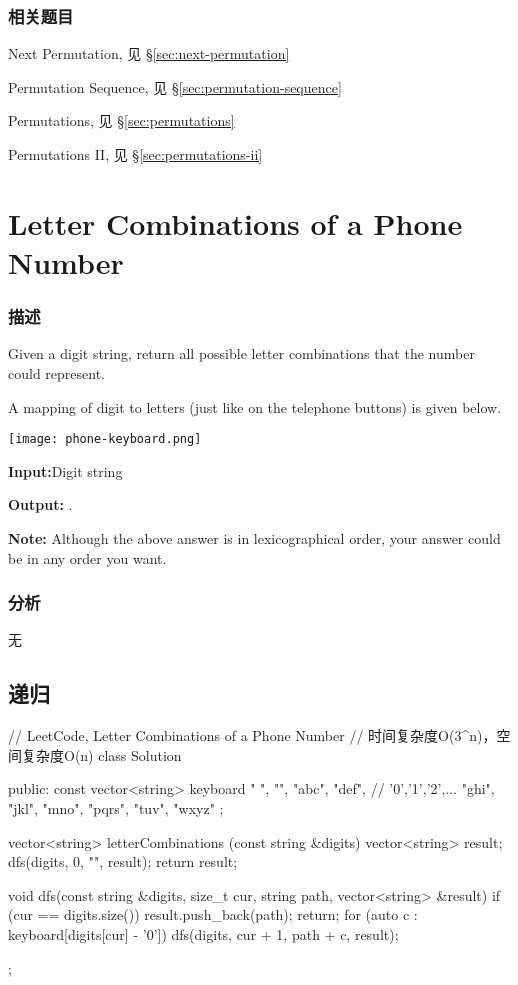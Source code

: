 \subsubsection{相关题目}
\begindot
\item Next Permutation, 见 \S \ref{sec:next-permutation}
\item Permutation Sequence, 见 \S \ref{sec:permutation-sequence}
\item Permutations, 见 \S \ref{sec:permutations}
\item Permutations II, 见 \S \ref{sec:permutations-ii}
\myenddot


\section{Letter Combinations of a Phone Number } %
\label{sec:letter-combinations-of-a-phone-number }


\subsubsection{描述}
Given a digit string, return all possible letter combinations that the number could represent.

A mapping of digit to letters (just like on the telephone buttons) is given below.

\begin{center}
	\texttt{[image: phone-keyboard.png]}\\
	\label{fig:phone-keyboard}
\end{center}

\textbf{Input:}Digit string 

\textbf{Output:} \code{["ad", "ae", "af", "bd", "be", "bf", "cd", "ce", "cf"]}.

\textbf{Note:}
Although the above answer is in lexicographical order, your answer could be in any order you want.


\subsubsection{分析}
无


\subsection{递归}
\begin{Code}
	// LeetCode, Letter Combinations of a Phone Number
	// 时间复杂度O(3^n)，空间复杂度O(n)
	class Solution {
		public:
		const vector<string> keyboard { " ", "", "abc", "def", // '0','1','2',...
			"ghi", "jkl", "mno", "pqrs", "tuv", "wxyz" };
		
		vector<string> letterCombinations (const string &digits) {
			vector<string> result;
			dfs(digits, 0, "", result);
			return result;
		}
		
		void dfs(const string &digits, size_t cur, string path,
		vector<string> &result) {
			if (cur == digits.size()) {
				result.push_back(path);
				return;
			}
			for (auto c : keyboard[digits[cur] - '0']) {
				dfs(digits, cur + 1, path + c, result);
			}
		}
	};
\end{Code}


